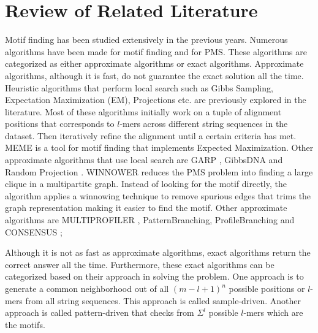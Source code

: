 \section{Review of Related Literature}
	Motif finding has been studied extensively in the previous years. Numerous algorithms have been made for motif finding and for PMS. These algorithms are categorized as either approximate algorithms or exact algorithms. Approximate algorithms, although it is fast, do not guarantee the exact solution all the time. Heuristic algorithms that perform local search such as Gibbs Sampling, Expectation Maximization (EM),  Projections etc. are previously explored in the literature. Most of these algorithms initially work on a tuple of alignment positions that corresponds to $l$-mers across different string sequences in the dataset. Then iteratively refine the alignment until a certain criteria has met. MEME \cite{Bailey2006} is a tool for motif finding that implements Expected Maximization. Other approximate algorithms that use local search are GARP \cite{huo2009combining}, GibbsDNA \cite{lawrence1993detecting} and Random Projection \cite{Buhler2001Tompa, huo2009combining}. WINNOWER \cite{pevzner2000combinatorial} reduces the PMS problem into finding a large clique in a multipartite graph. Instead of looking for the motif directly, the algorithm applies a winnowing technique to remove spurious edges that trims the graph representation making it easier to find the motif. Other approximate algorithms are MULTIPROFILER \cite{Keich01102002},  PatternBranching, ProfileBranching \cite{Price27092003} and CONSENSUS \cite{hertz1999identifying};


	Although it is not as fast as approximate algorithms, exact algorithms return the correct answer all the time. Furthermore, these exact algorithms can be categorized based on their approach in solving the problem. One approach is to generate a common neighborhood out of all $(m - l + 1)^n$ possible positions or $l$-mers from all string sequences. This approach is called sample-driven. Another approach is called pattern-driven that checks from $\Sigma^l$ possible $l$-mers which are the motifs. 

